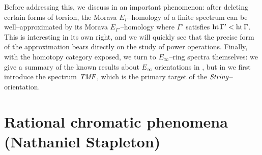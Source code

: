 \noindent Before addressing this, we discuss in  an important phenomenon: after deleting certain forms of torsion, the Morava \(E_\Gamma\)--homology of a finite spectrum can be well--approximated by its Morava \(E_{\Gamma'}\)--homology where \(\Gamma'\) satisfies \(\operatorname{ht}{\Gamma'} < \operatorname{ht}{\Gamma}\).  This is interesting in its own right, and we will quickly see that the precise form of the approximation bears directly on the study of power operations.  Finally, with the homotopy category exposed, we turn to \(E_\infty\)--ring spectra themselves: we give a summary of the known results about \(E_\infty\) orientations in , but in  we first introduce the spectrum \(\mathit{TMF}\), which is the primary target of the \(\mathit{String}\)--orientation.













\section{Rational chromatic phenomena (Nathaniel Stapleton)}\label{CharacterTheorySection}

